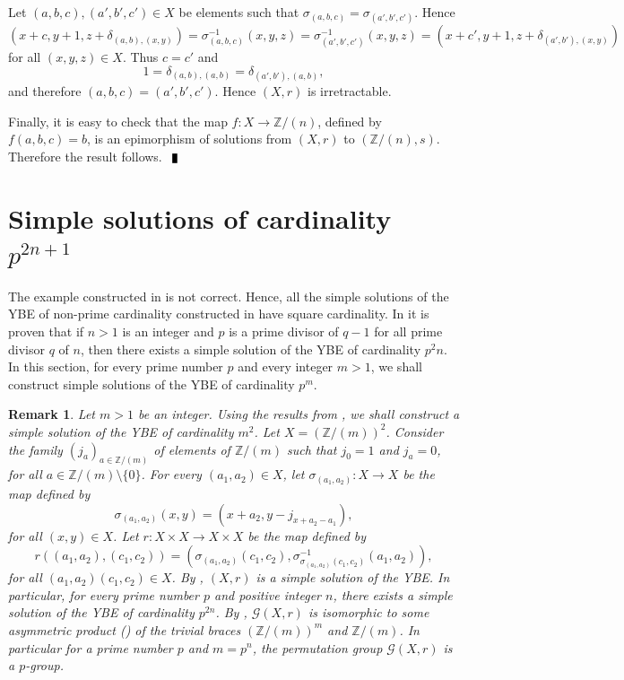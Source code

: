 \documentclass[10pt]{article}
\newtheorem{remark}[theorem]{Remark}
\newcommand{\Z}{\mathbb{Z}}
\newenvironment{proof}{\par\noindent{ Proof.}}{$\qed$\par\bigskip}
\newcommand{\qed}{\enspace\vrule  height6pt  width4pt  depth2pt}
\begin{document}
\begin{proof}
     Let $(a,b,c),(a',b',c')\in X$ be elements such that $\sigma_{(a,b,c)}=\sigma_{(a',b',c')}$. Hence
     $$(x+c,y+1,z+\delta_{(a,b),(x,y)})=\sigma^{-1}_{(a,b,c)}(x,y,z)=\sigma^{-1}_{(a',b',c')}(x,y,z)=(x+c',y+1,z+\delta_{(a',b'),(x,y)})$$
     for all $(x,y,z)\in X$. Thus $c=c'$ and
     $$1=\delta_{(a,b),(a,b)}=\delta_{(a',b'),(a,b)},$$
     and therefore $(a,b,c)=(a',b',c')$. Hence $(X,r)$ is irretractable.

     Finally, it is easy to check that the map $f\colon X\longrightarrow \Z/(n)$, defined by $f(a,b,c)=b$,
     is an epimorphism of solutions from $(X,r)$ to $(\Z/(n), s)$. Therefore the result follows.
\end{proof}


 \section{Simple solutions of cardinality $p^{2n+1}$}\label{pn}

The example constructed in \cite[Theorem~4.12]{CO21} is not
correct. Hence, all the simple solutions of the YBE of
non-prime cardinality constructed in \cite{CO21, CO22} have square
cardinality. In \cite[Theorem 5.3]{CO24} it is proven that if
$n>1$ is an integer and $p$ is a prime divisor of $q-1$ for all
prime divisor $q$ of $n$, then there exists a simple solution of
the YBE of cardinality $p^2n$. In this section, for every prime
number $p$ and every integer $m>1$, we shall construct simple
solutions of the YBE of cardinality $p^m$.


\begin{remark}
    {\rm Let $m>1$ be an integer. Using the results from \cite{CO21},
    we shall construct a simple solution of the YBE of cardinality $m^2$.
        Let $X=(\Z/(m))^2$. Consider the family $(j_a)_{a\in\Z/(m)}$
        of elements of $\Z/(m)$ such that $j_0=1$ and $j_a=0$, for all
        $a\in\Z/(m)\setminus\{ 0\}$. For every $(a_1,a_2)\in X$, let
        $\sigma_{(a_1,a_2)}\colon X\longrightarrow X$ be the map defined by
        $$\sigma_{(a_1,a_2)}(x,y)=(x+a_2, y-j_{x+a_2-a_1}),$$
        for all $(x,y)\in X$. Let $r\colon X\times X\longrightarrow X\times X$
        be the map defined by
        $$r((a_1,a_2),(c_1,c_2))=(\sigma_{(a_1,a_2)}(c_1,c_2),\sigma^{-1}_{\sigma_{(a_1,a_2)}(c_1,c_2)}(a_1,a_2)),$$
        for all $(a_1,a_2)(c_1,c_2)\in X$.  By \cite[Theorem 4.9]{CO21},
        $(X,r)$ is a simple solution of the YBE.  In particular, for every prime number $p$ and positive integer
        $n$, there exists a simple solution of the YBE of cardinality $p^{2n}$. By \cite[Proposition 6.2]{CO21}, $\mathcal{G}(X,r)$ is isomorphic to some asymmetric product (\cite{CCS}) of the trivial braces $(\Z/(m))^m$ and $\Z/(m)$. In particular for a prime number $p$ and $m=p^n$, the permutation group $\mathcal{G}(X,r)$ is a $p$-group. }
\end{remark}
\end{document}
